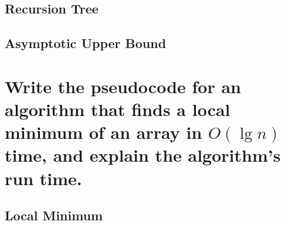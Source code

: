 \subsection{Recursion Tree}
\subsection{Asymptotic Upper Bound}

\section{Write the pseudocode for an algorithm that finds a local minimum of an array in $O(\lg n)$ time, and explain the algorithm's run time.}
\subsection{Local Minimum}

